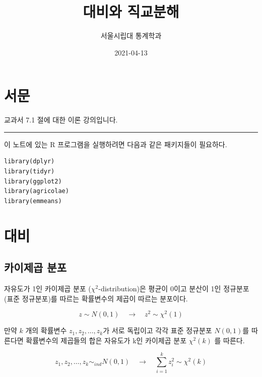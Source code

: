 \documentclass[
]{book}
\title{대비와 직교분해}
\author{서울시립대 통계학과}
\date{2021-04-13}
\begin{document}
\maketitle

{
\setcounter{tocdepth}{1}
\tableofcontents
}
\hypertarget{uxc11cuxbb38}{%
\chapter*{서문}\label{uxc11cuxbb38}}


교과서 7.1 절에 대한 이론 강의입니다.

\begin{center}\rule{0.5\linewidth}{0.5pt}\end{center}

이 노트에 있는 R 프로그램을 실행하려면 다음과 같은 패키지들이 필요하다.

\begin{verbatim}
library(dplyr)
library(tidyr)
library(ggplot2)
library(agricolae)
library(emmeans)
\end{verbatim}

\mainmatter

\hypertarget{contrast}{%
\chapter{대비}\label{contrast}}

\hypertarget{uxce74uxc774uxc81cuxacf1-uxbd84uxd3ec}{%
\section{카이제곱 분포}\label{uxce74uxc774uxc81cuxacf1-uxbd84uxd3ec}}

자유도가 1인 카이제곱 분포 (\(\chi^2\)-distribution)은 평균이 0이고 분산이 1인 정규분포(표준 정규분포)를 따르는 확률변수의 제곱이 따르는 분포이다.

\begin{equation}
z \sim N(0,1) \quad \rightarrow \quad z^2 \sim \chi^2(1)
\label{eq:chidist1}
\end{equation}

만약 \(k\) 개의 확률변수 \(z_1, z_2, \dots, z_k\)가 서로 독립이고 각각 표준 정규분포 \(N(0,1)\)를 따른다면 확률변수의 제곱들의 합은 자유도가 k인 카이제곱 분포 \(\chi^2(k)\) 를 따른다.

\begin{equation}
z_1, z_2, \dots, z_k \sim_{ind} N(0,1) \quad \rightarrow \quad \sum_{i=1}^k z_i^2  \sim \chi^2(k)
\label{eq:chidist2}
\end{equation}
\end{document}

